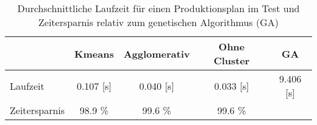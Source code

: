 \begin{table}[ht]
\caption{Durchschnittliche Laufzeit für einen Produktionsplan im Test und Zeitersparnis relativ zum genetischen Algorithmus (GA)}
\centering
\label{tab:zeiten_testing}
\begin{tabular}{lcccc}
\hline
\textbf{} & \textbf{Kmeans} & \textbf{Agglomerativ} & \textbf{Ohne Cluster}  & \textbf{GA} \\
\hline
Laufzeit & 0.107 [s] & 0.040 [s] & 0.033 [s] & 9.406 [s] \\
Zeitersparnis & 98.9 \% & 99.6 \% & 99.6 \% &  \\
\hline
\end{tabular}
\end{table}
